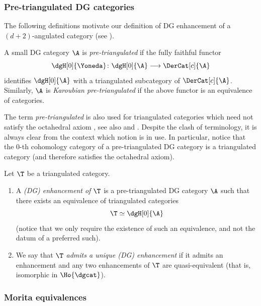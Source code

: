 \documentclass[a4paper]{amsart}
\begin{document}
\subsubsection{Pre-triangulated DG categories}

The following definitions motivate our definition of DG enhancement of a
$(d+2)$-angulated category (see
).

\begin{definition}[{\cite{BK90}}]
  \label{def:pre-trianguled_DG}
  A small DG category $\A$ is \emph{pre-triangulated} if the fully faithful
  functor
  \[
    \dgH[0]{\Yoneda}\colon\dgH[0]{\A}\longrightarrow\DerCat[c]{\A}
  \]
  identifies $\dgH[0]{\A}$ with a triangulated subcategory of $\DerCat[c]{\A}$.
  Similarly, $\A$ is \emph{Karoubian pre-triangulated} if the above functor is
  an equivalence of categories.
\end{definition}

\begin{remark}
  The term \emph{pre-triangulated} is also used for triangulated categories
  which need not satisfy the octahedral axiom \cite[Def.~1.1.2]{Nee01}, see also
   and . Despite the clash of
  terminology, it is always clear from the context which notion is in use. In
  particular, notice that the $0$-th cohomology category of a pre-triangulated
  DG category is a triangulated category (and therefore satisfies the octahedral
  axiom).
\end{remark}

\begin{definition}[{\cite{BK90}}]
  \label{def:DG_enhancement}
  Let $\T$ be a triangulated category.
  \begin{enumerate}
  \item A \emph{(DG) enhancement of $\T$} is a pre-triangulated DG category $\A$
    such that there exists an equivalence of triangulated categories
    \[
      \T\simeq\dgH[0]{\A}
    \]
    (notice that we only require the existence of such an equivalence, and not
    the datum of a preferred such).
  \item We say that \emph{$\T$ admits a unique (DG) enhancement} if it admits an
    enhancement and any two enhancements of $\T$ are quasi-equivalent (that is,
    isomorphic in $\Ho{\dgcat}$).
  \end{enumerate}
\end{definition}

\subsubsection{Morita equivalences}
\end{document}
